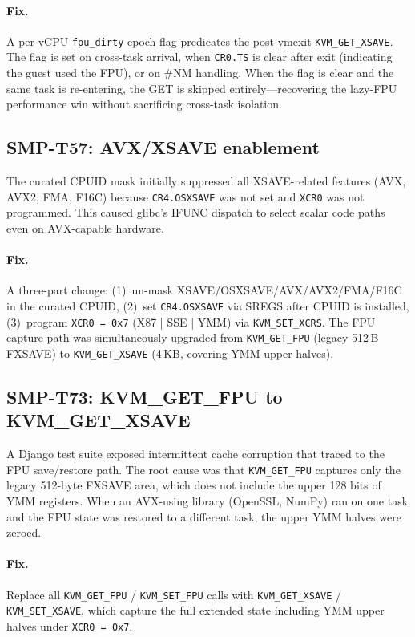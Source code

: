 \paragraph{Fix.}
A per-vCPU \texttt{fpu\_dirty} epoch flag predicates the post-vmexit
\texttt{KVM\_GET\_XSAVE}.  The flag is set on cross-task arrival, when
\texttt{CR0.TS} is clear after exit (indicating the guest used the FPU),
or on \#NM handling.  When the flag is clear and the same task is
re-entering, the GET is skipped entirely---recovering the lazy-FPU
performance win without sacrificing cross-task isolation.

\subsection{SMP-T57: AVX/XSAVE enablement}

The curated CPUID mask initially suppressed all XSAVE-related features
(AVX, AVX2, FMA, F16C) because \texttt{CR4.OSXSAVE} was not set and
\texttt{XCR0} was not programmed.  This caused glibc's IFUNC dispatch to
select scalar code paths even on AVX-capable hardware.

\paragraph{Fix.}
A three-part change: (1)~un-mask XSAVE/OSXSAVE/AVX/AVX2/FMA/F16C in the
curated CPUID, (2)~set \texttt{CR4.OSXSAVE} via SREGS after CPUID is
installed, (3)~program \texttt{XCR0 = 0x7} (X87 | SSE | YMM) via
\texttt{KVM\_SET\_XCRS}.  The FPU capture path was simultaneously
upgraded from \texttt{KVM\_GET\_FPU} (legacy 512\,B FXSAVE) to
\texttt{KVM\_GET\_XSAVE} (4\,KB, covering YMM upper halves).

\subsection{SMP-T73: KVM\_GET\_FPU to KVM\_GET\_XSAVE}

A Django test suite exposed intermittent cache corruption that traced to
the FPU save/restore path.  The root cause was that
\texttt{KVM\_GET\_FPU} captures only the legacy 512-byte FXSAVE area,
which does not include the upper 128 bits of YMM registers.  When an
AVX-using library (OpenSSL, NumPy) ran on one task and the FPU state
was restored to a different task, the upper YMM halves were zeroed.

\paragraph{Fix.}
Replace all \texttt{KVM\_GET\_FPU} / \texttt{KVM\_SET\_FPU} calls with
\texttt{KVM\_GET\_XSAVE} / \texttt{KVM\_SET\_XSAVE}, which capture the
full extended state including YMM upper halves under \texttt{XCR0 = 0x7}.

